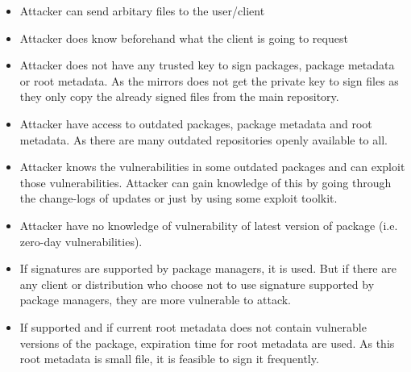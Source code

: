 \documentclass{IEEEtran}
\begin{document}
\begin{itemize}
	\item Attacker can send arbitary files to the user/client
	\item Attacker does know beforehand what the client is going to request
	\item Attacker does not have any trusted key to sign packages, package metadata or root metadata. As the mirrors does not get the private key to sign files as they only copy the already signed files from the main repository.
	\item Attacker have access to outdated packages, package metadata and root metadata. As there are many outdated repositories openly available to all.
	\item Attacker knows the vulnerabilities in some outdated packages and can exploit those vulnerabilities. Attacker can gain knowledge of this by going through the change-logs of updates or just by using some exploit toolkit.
	\item Attacker have no knowledge of vulnerability of latest version of package (i.e. zero-day vulnerabilities).
	\item If signatures are supported by package managers, it is used. But if there are any client or distribution who choose not to use signature supported by package managers, they are more vulnerable to attack.
	\item If supported and if current root metadata does not contain vulnerable versions of the package, expiration time for root metadata are used. As this root metadata is small file, it is feasible to sign it frequently. 
\end{itemize}
\end{document}
